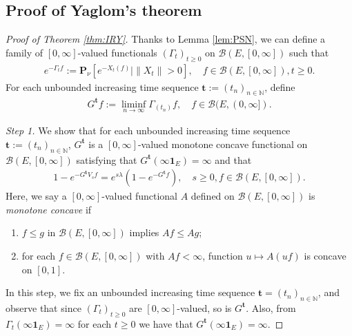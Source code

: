 \documentclass[12pt,a4paper]{amsart}
\numberwithin{equation}{section}
\theoremstyle{plain}
\theoremstyle{definition}
\begin{document}
\subsection{Proof of Yaglom's theorem}
\label{sec:MY}
\begin{proof}[Proof of Theorem \ref{thm:IRY}]

Thanks to Lemma \ref{lem:PSN}, we can define a family of $[0,\infty]$-valued functionals $(\Gamma_t)_{t\geq 0}$ on $\mathcal B(E, [0,\infty])$ such that
\begin{align}
  e^{-\Gamma_t f}
  := \mathbf P_{\nu}[e^{- X_t(f)}| \|X_t\| > 0], 
  \quad f\in \mathcal B(E,[0,\infty]), t \geq 0.
\end{align}
For each unbounded increasing time sequence $\mathbf t:= (t_n)_{n\in \mathbb N}$, define
\begin{align}
  G^{\mathbf t}f 
  := \liminf_{n\to \infty} \Gamma_{(t_n)}f,
  \quad f\in \mathcal B(E, (0,\infty]).
\end{align}

\emph{Step 1.}
We show that for each unbounded increasing time sequence $\mathbf t:= (t_n)_{n\in \mathbb N}$, $G^{\mathbf t}$ is a $[0,\infty]$-valued monotone concave functional on $\mathcal B(E,[0,\infty])$ satisfying that $G^{\mathbf t}(\infty \mathbf 1_E) = \infty$ and that
\begin{align}
  \label{eq:MY1}
  1 - e^{- G^{\mathbf t}V_sf} 
  = e^{s\lambda} (1- e^{- G^{\mathbf t} f}),
  \quad s \geq 0, f \in \mathcal B(E, [0,\infty]).
\end{align}
Here, we say a $[0,\infty]$-valued functional $A$ defined on $\mathcal B(E,[0,\infty])$ is \emph{monotone concave} if 
\begin{enumerate}
\item
  $f\leq g$ in $\mathcal B(E,[0,\infty])$ implies $Af\leq Ag$;
\item
  for each $f\in \mathcal B(E,[0,\infty])$ with $Af<\infty$, function $u\mapsto A(uf)$ is concave on $[0, 1]$.  
\end{enumerate}

In this step, we fix an unbounded increasing time sequence $\mathbf t = (t_n)_{n\in \mathbb N}$, and observe that since $(\Gamma_t)_{t\geq 0}$ are $[0,\infty]$-valued, so is $G^{\mathbf t}$. 
Also, from $\Gamma_t(\infty \mathbf 1_E) = \infty$ for each $t\geq 0$ we have that $G^{\mathbf t}(\infty \mathbf 1_E) = \infty$.


\end{proof}
\end{document}

